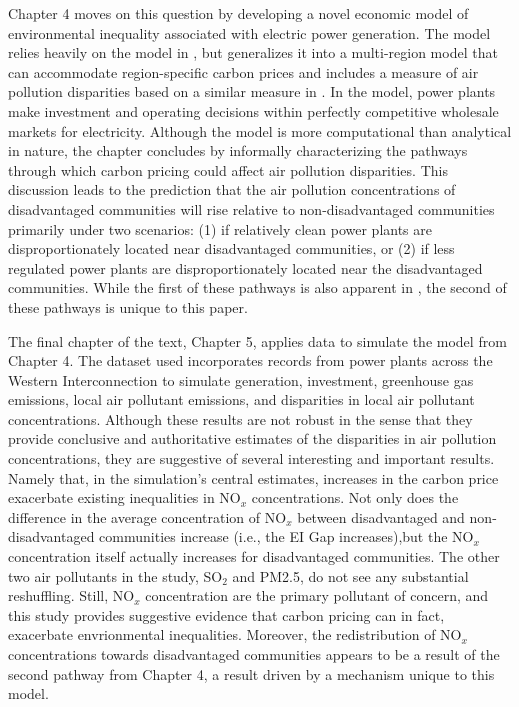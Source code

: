 Chapter 4 moves on this question by developing a novel economic model of environmental inequality associated with electric power generation. The model relies heavily on the model in \cite{weber2021dynamic}, but generalizes it into a multi-region model that can accommodate region-specific carbon prices and includes a measure of air pollution disparities based on a similar measure in \cite{hernandez2023environmental}. In the model, power plants make investment and operating decisions within perfectly competitive wholesale markets for electricity. Although the model is more computational than analytical in nature, the chapter concludes by informally characterizing the pathways through which carbon pricing could affect air pollution disparities. This discussion leads to the prediction that the air pollution concentrations of disadvantaged communities will rise relative to non-disadvantaged communities primarily under two scenarios: (1) if relatively clean power plants are disproportionately located near disadvantaged communities, or (2) if less regulated power plants are disproportionately located near the disadvantaged communities. While the first of these pathways is also apparent in \cite{weber2021dynamic}, the second of these pathways is unique to this paper. 

The final chapter of the text, Chapter 5, applies data to simulate the model from Chapter 4. The dataset used incorporates records from power plants across the Western Interconnection to simulate generation, investment, greenhouse gas emissions, local air pollutant emissions, and disparities in local air pollutant concentrations. Although these results are not robust in the sense that they provide conclusive and authoritative estimates of the disparities in air pollution concentrations, they are suggestive of several interesting and important results. Namely that, in the simulation's central estimates, increases in the carbon price exacerbate existing inequalities in NO$_x$ concentrations. Not only does the difference in the average concentration of NO$_x$ between disadvantaged and non-disadvantaged communities increase (i.e., the EI Gap increases),but the NO$_x$ concentration itself actually increases for disadvantaged communities. The other two air pollutants in the study, SO$_2$ and PM2.5, do not see any substantial reshuffling. Still, NO$_x$ concentration are the primary pollutant of concern, and this study provides suggestive evidence that carbon pricing can in fact, exacerbate envrionmental inequalities. Moreover, the redistribution of NO$_x$ concentrations towards disadvantaged communities appears to be a result of the second pathway from Chapter 4, a result driven by a mechanism unique to this model. 

